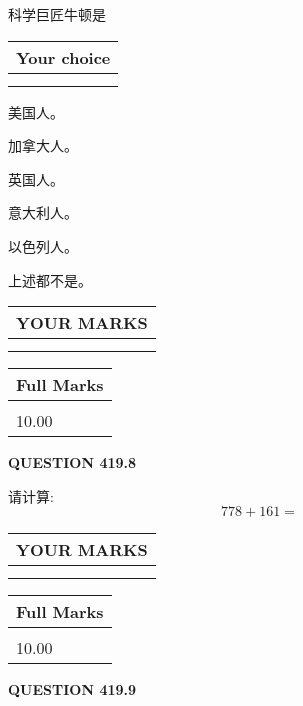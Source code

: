\documentclass{ctexart}
\begin{document}
  
科学巨匠牛顿是
  
  
\noindent\hspace{3.0in} \begin{tabular}{|l|}
\hline
Your choice \\
\hline
 \\ 
 \\ 
\hline
\end{tabular}
  
  
 
 
美国人。
 
 
加拿大人。
 
 
英国人。
 
 
意大利人。
 
 
以色列人。
 
 
 上述都不是。
 
 
  
\vspace{0.2in}
  
\noindent\begin{tabular}{|l|}
\hline
 YOUR MARKS  \\
\hline
 \\ 
 \\ 
\hline
\end{tabular}
\hspace{0.05in} \begin{tabular}{|l|}
\hline
 Full Marks  \\
\hline
 \\ 
10.00 \\
\hline
\end{tabular}
{\textbf{\Large{QUESTION
419.8 
}}}
  
  
 
请计算:
\begin{equation}
778 +  %
161 = \nonumber
\end{equation}
 

 

 
  
\vspace{0.2in}
  
\noindent\begin{tabular}{|l|}
\hline
 YOUR MARKS  \\
\hline
 \\ 
 \\ 
\hline
\end{tabular}
\hspace{0.05in} \begin{tabular}{|l|}
\hline
 Full Marks  \\
\hline
 \\ 
10.00 \\
\hline
\end{tabular}
{\textbf{\Large{QUESTION
419.9 
}}}
  
\end{document}
